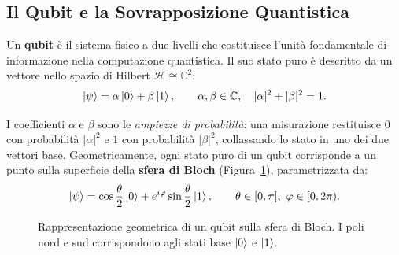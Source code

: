 \subsection{Il Qubit e la Sovrapposizione Quantistica}
\label{subsec:qubit}

\begin{definizione}[Qubit]
  Un \textbf{qubit} è il sistema fisico a due livelli che costituisce l'unità
  fondamentale di informazione nella computazione quantistica. Il suo stato puro
  è descritto da un vettore nello spazio di Hilbert $\mathcal{H} \cong \mathbb{C}^2$:
  \begin{equation}
    \ket{\psi} = \alpha\ket{0} + \beta\ket{1}, \qquad
    \alpha, \beta \in \mathbb{C}, \quad |\alpha|^2 + |\beta|^2 = 1.
    \label{eq:qubit}
  \end{equation}
\end{definizione}

I coefficienti $\alpha$ e $\beta$ sono le \textit{ampiezze di probabilità}: una
misurazione restituisce $0$ con probabilità $|\alpha|^2$ e $1$ con probabilità
$|\beta|^2$, collassando lo stato in uno dei due vettori base. Geometricamente,
ogni stato puro di un qubit corrisponde a un punto sulla superficie della
\textbf{sfera di Bloch} (Figura~\ref{fig:bloch}), parametrizzata da:
\begin{equation}
  \ket{\psi} = \cos\frac{\theta}{2}\ket{0} + e^{i\varphi}\sin\frac{\theta}{2}\ket{1},
  \qquad \theta \in [0,\pi],\ \varphi \in [0, 2\pi).
\end{equation}

\begin{figure}[ht]
  \centering
  \caption{Rappresentazione geometrica di un qubit sulla sfera di Bloch.
    I poli nord e sud corrispondono agli stati base $\ket{0}$ e $\ket{1}$.}
  \label{fig:bloch}
\end{figure}

